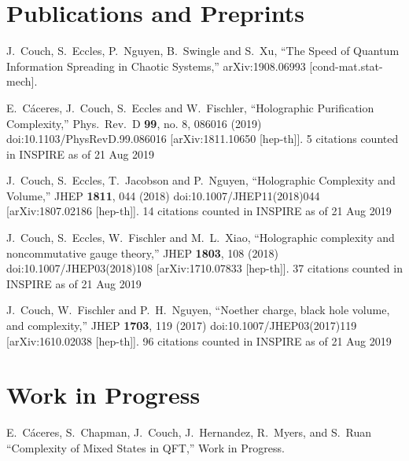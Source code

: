 \documentclass[letterpaper]{article}
\renewenvironment{itemize}{
  \begin{list}{}{
    \setlength{\leftmargin}{1.5em}
  }
}{
  \end{list}
}
\begin{document}
\section*{Publications and Preprints}
\begin{itemize}

\item
  J.~Couch, S.~Eccles, P.~Nguyen, B.~Swingle and S.~Xu,
  ``The Speed of Quantum Information Spreading in Chaotic Systems,''
  arXiv:1908.06993 [cond-mat.stat-mech].

\item 
  E.~C\'aceres, J.~Couch, S.~Eccles and W.~Fischler,
  ``Holographic Purification Complexity,''
  Phys.\ Rev.\ D {\bf 99}, no. 8, 086016 (2019)
  doi:10.1103/PhysRevD.99.086016
  [arXiv:1811.10650 [hep-th]].
  5 citations counted in INSPIRE as of 21 Aug 2019

\item 
  J.~Couch, S.~Eccles, T.~Jacobson and P.~Nguyen,
  ``Holographic Complexity and Volume,''
  JHEP {\bf 1811}, 044 (2018)
  doi:10.1007/JHEP11(2018)044
  [arXiv:1807.02186 [hep-th]].
  14 citations counted in INSPIRE as of 21 Aug 2019
  
\item
  J.~Couch, S.~Eccles, W.~Fischler and M.~L.~Xiao,
  ``Holographic complexity and noncommutative gauge theory,''
  JHEP {\bf 1803}, 108 (2018)
  doi:10.1007/JHEP03(2018)108
  [arXiv:1710.07833 [hep-th]].
  37 citations counted in INSPIRE as of 21 Aug 2019

\item  
  J.~Couch, W.~Fischler and P.~H.~Nguyen,
  ``Noether charge, black hole volume, and complexity,''
  JHEP {\bf 1703}, 119 (2017)
  doi:10.1007/JHEP03(2017)119
  [arXiv:1610.02038 [hep-th]].
  96 citations counted in INSPIRE as of 21 Aug 2019

  
\end{itemize}

\section*{Work in Progress}
\begin{itemize}

\item 
  E.~C\'aceres, S.~Chapman, J.~Couch, J.~Hernandez, R.~Myers, and S.~Ruan
  ``Complexity of Mixed States in QFT,''
  Work in Progress.

\end{itemize}
\end{document}

